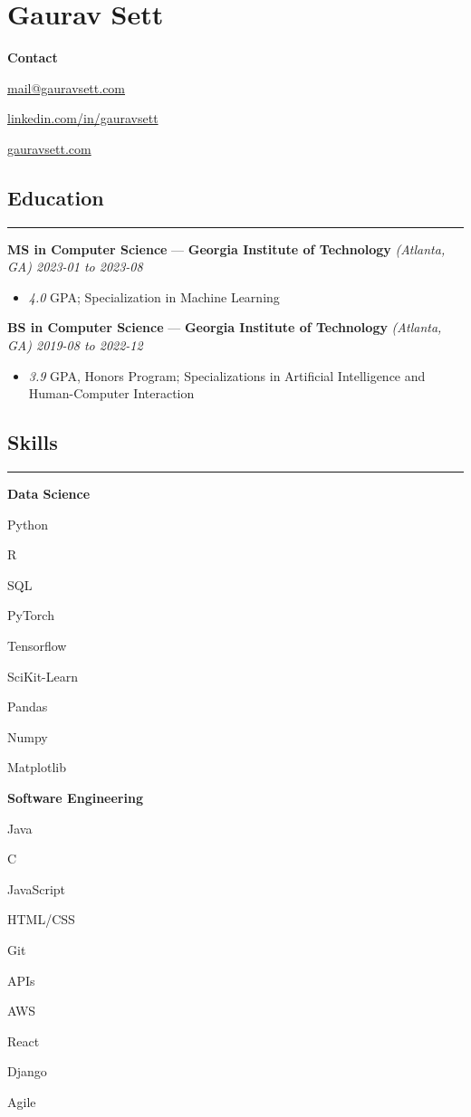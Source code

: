 \documentclass[10pt]{article}
\newcommand{\resumeHeading}[1]{
    \subsection*{#1}
    \hrule
    \vspace*{5pt}
}
\newcommand{\resumeSubHeading}[5]{
    \vspace*{5pt}
    \textbf{#1} — \textbf{#2} \textsl{(#3) \hfill #4 to #5}
}
\newcommand{\resumeListHeading}[1]{\vspace*{5pt}\textbf{#1}}
\begin{document}
\section*{Gaurav Sett}

\textbf{Contact}
\begin{itemize*}[label=$|$]
    \item \href{mailto:mail@gauravsett.com}{mail@gauravsett.com}
    \item \href{https://linkedin.com/in/gauravsett}{linkedin.com/in/gauravsett}
    \item \href{https://gauravsett.com}{gauravsett.com}
\end{itemize*}



\resumeHeading{Education}

\resumeSubHeading
    {MS in Computer Science}
    {Georgia Institute of Technology}
    {Atlanta, GA}
    {2023-01}
    {2023-08}
\begin{itemize}
    \item \emph{4.0} GPA;\:
        Specialization in Machine Learning
\end{itemize}

\resumeSubHeading
    {BS in Computer Science}
    {Georgia Institute of Technology}
    {Atlanta, GA}
    {2019-08}
    {2022-12}
\begin{itemize}
    \item \emph{3.9} GPA, Honors Program;\: 
        Specializations in Artificial Intelligence and Human-Computer Interaction
\end{itemize}



\resumeHeading{Skills}

\resumeListHeading{Data Science}
\begin{itemize*}[label=$|$]
    \item Python
    \item R
    \item SQL
    \item PyTorch
    \item Tensorflow
    \item SciKit-Learn
    \item Pandas
    \item Numpy
    \item Matplotlib
\end{itemize*}

\resumeListHeading{Software Engineering}
\begin{itemize*}[label=$|$]
    \item Java
    \item C
    \item JavaScript 
    \item HTML/CSS 
    \item Git
    \item APIs
    \item AWS
    \item React
    \item Django
    \item Agile
\end{itemize*}
\end{document}
